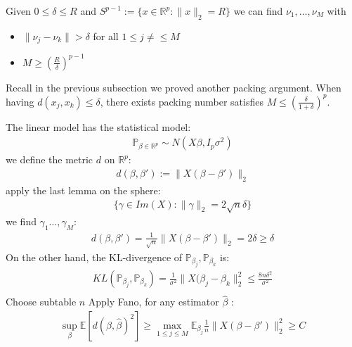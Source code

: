\begin{lemma}
Given $0 \le \delta \le R$ and $S^{p-1} := \{ x \in \mathbb{R}^p: \|x\|_2 = R\}$ we can find $\nu_1, \dots, \nu_M$ with
\begin{itemize}
	\item $\|\nu_j - \nu_k\| > \delta$ for all $1 \le j \neq \le M$
	\item $M \geq (\frac{R}{\delta})^{p-1}$
\end{itemize}
\end{lemma}
\begin{remark}
Recall in the previous subsection we proved another packing argument. When having $d(x_j, x_k) \le \delta$, there exists packing number satisfies $M \le (\frac{\delta}{1+ \delta})^p$.	
\end{remark}


\begin{example}
	The linear model has the statistical model:
	\begin{align*}
		\mathbb{P}_{\beta \in \mathbb{R}^p} \sim N(X\beta, I_p \sigma^2)
	\end{align*}
	we define the metric $d$ on $\mathbb{R}^p$:
	\begin{align*}
		d(\beta, \beta'):= \|X(\beta - \beta')\|_2
	\end{align*}
	apply the last lemma on the sphere:
	\begin{align*}
		\{\gamma \in Im(X): \|\gamma\|_2 = 2 \sqrt{n} \delta\}
	\end{align*}
	we find $\gamma_1 \dots, \gamma_M$:
	\begin{align*}
		d(\beta, \beta') = \frac{1}{\sqrt{n}}\|X(\beta - \beta')\|_2 = 2 \delta \ge \delta
	\end{align*}
	On the other hand, the KL-divergence of $\mathbb{P}_{\beta_j}, \mathbb{P}_{\beta_k}$ is:
	\begin{align*}
		KL(\mathbb{P}_{\beta_j}, \mathbb{P}_{\beta_k}) = \frac{1}{\sigma^2}\|X(\beta_j - \beta_k\|^2_2 \le \frac{8n\delta^2}{\sigma^2} \\
	\end{align*}
	Choose subtable $n$ Apply Fano, for any estimator $\hat{\beta}$ :
	\begin{align*}
		\sup_\beta\mathbb{E}[d(\beta , \hat{\beta})^2 ] \ge \max_{1 \le j \le M} \mathbb{E}_{\beta_j} \frac{1}{n}\|X(\beta - \beta')\|_2^2 \ge C 
	\end{align*}
\end{example}

